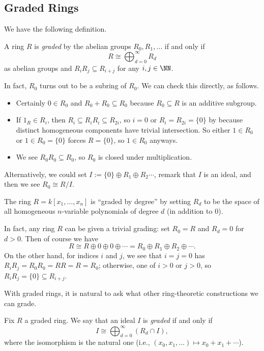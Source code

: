 \documentclass[../notes.tex]{subfiles}
\begin{document}
\subsection{Graded Rings}
We have the following definition.
\begin{definition}
	A ring $R$ is \textit{graded} by the abelian groups $R_0,R_1,\ldots$ if and only if
	\[R\cong\bigoplus_{d=0}^\infty R_d\]
	as abelian groups and $R_iR_j\subseteq R_{i+j}$ for any $i,j\in\NN$.
\end{definition}
\begin{remark}[Nir]
	In fact, $R_0$ turns out to be a subring of $R_0$. We can check this directly, as follows.
	\begin{itemize}
		\item Certainly $0\in R_0$ and $R_0+R_0\subseteq R_0$ because $R_0\subseteq R$ is an additive subgroup.
		\item If $1_R\in R_i$, then $R_i\subseteq R_iR_i\subseteq R_{2i}$, so $i=0$ or $R_i=R_{2i}=\{0\}$ by because distinct homogeneous components have trivial intersection. So either $1\in R_0$ or $1\in R_0=\{0\}$ forces $R=\{0\}$, so $1\in R_0$ anyways.
		\item We see $R_0R_0\subseteq R_0$, so $R_0$ is closed under multiplication.
	\end{itemize}
	Alternatively, we could set $I:=\{0\}\oplus R_1\oplus R_2\cdots$, remark that $I$ is an ideal, and then we see $R_0\cong R/I$.
\end{remark}
\begin{example}
	The ring $R=k[x_1,\ldots,x_n]$ is ``graded by degree'' by setting $R_d$ to be the space of all homogeneous $n$-variable polynomials of degree $d$ (in addition to $0$).
\end{example}
\begin{remark}[Nir] \label{rem:trivialgrade}
	In fact, any ring $R$ can be given a trivial grading: set $R_0=R$ and $R_d=0$ for $d>0$. Then of course we have
	\[R\cong R\oplus 0\oplus 0\oplus\cdots=R_0\oplus R_1\oplus R_2\oplus\cdots.\]
	On the other hand, for indices $i$ and $j$, we see that $i=j=0$ has $R_iR_j=R_0R_0=RR=R=R_0$; otherwise, one of $i>0$ or $j>0$, so $R_iR_j=\{0\}\subseteq R_{i+j}$.
\end{remark}
With graded rings, it is natural to ask what other ring-theoretic constructions we can grade.
\begin{definition}
	Fix $R$ a graded ring. We say that an ideal $I$ is \textit{graded} if and only if
	\[I\cong\bigoplus_{d=0}^\infty(R_d\cap I),\]
	where the isomorphism is the natural one (i.e., $(x_0,x_1,\ldots)\mapsto x_0+x_1+\cdots$).
\end{definition}
\end{document}
